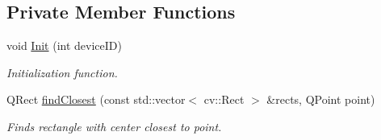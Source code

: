\subsection*{Private Member Functions}
\begin{DoxyCompactItemize}
\item 
void \hyperlink{class_face_tracker_a189f02c677e1060792208c9ee1eb3222}{Init} (int device\-I\-D)
\begin{DoxyCompactList}\small\item\em Initialization function. \end{DoxyCompactList}\item 
Q\-Rect \hyperlink{class_face_tracker_abc157c27b7002840cf82faedc23a1b57}{find\-Closest} (const std\-::vector$<$ cv\-::\-Rect $>$ \&rects, Q\-Point point)
\begin{DoxyCompactList}\small\item\em Finds rectangle with center closest to point. \end{DoxyCompactList}\end{DoxyCompactItemize}
